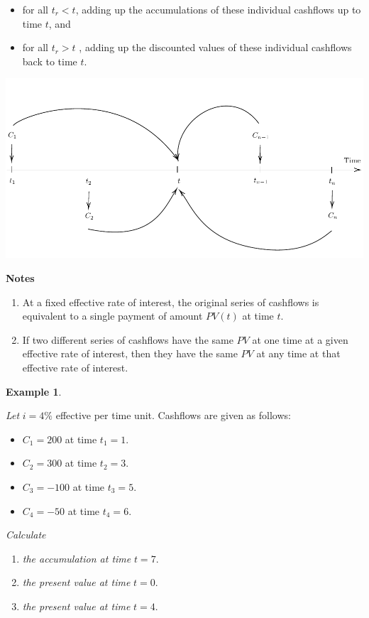 \documentclass[landscape, 20pt]{extreport}
\theoremstyle{definition}
\theoremstyle{definition}
\newtheorem{example}{Example}[chapter]
\theoremstyle{definition}
\theoremstyle{definition}
\theoremstyle{remark}
\begin{document}
\begin{itemize}
\item
  for all \(t_r < t\), adding up the accumulations of these individual
  cashflows up to time \(t\), and
\item
  for all \(t_r > t\) , adding up the discounted values of these
  individual cashflows back to time \(t\).
\end{itemize}

\begin{center}\includegraphics{tikz-ex7-1} \end{center}

\textbf{Notes}

\begin{enumerate}
\def\labelenumi{\arabic{enumi}.}
\item
  At a fixed effective rate of interest, the original series of
  cashflows is equivalent to a single payment of amount \(PV(t)\) at
  time \(t\).
\item
  If two different series of cashflows have the same \(PV\) at one time
  at a given effective rate of interest, then they have the same \(PV\)
  at any time at that effective rate of interest.
\end{enumerate}

\newpage \begin{example}
\protect\hypertarget{exm:unlabeled-div-24}{}\label{exm:unlabeled-div-24}

\emph{Let} \(i = 4\%\) effective per time unit. Cashflows are given as follows:

\begin{itemize}
\item
  \(C_1 = 200\) at time \(t_1 = 1\).
\item
  \(C_2 = 300\) at time \(t_2 = 3\).
\item
  \(C_3 = -100\) at time \(t_3 = 5\).
\item
  \(C_4 = -50\) at time \(t_4 = 6\).
\end{itemize}

\emph{Calculate}

\begin{enumerate}
\def\labelenumi{\arabic{enumi}.}
\item
  \emph{the accumulation at time} \(t = 7\).
\item
  \emph{the present value at time} \(t = 0\).
\item
  \emph{the present value at time} \(t = 4\).
\end{enumerate}

\end{example}
\end{document}
